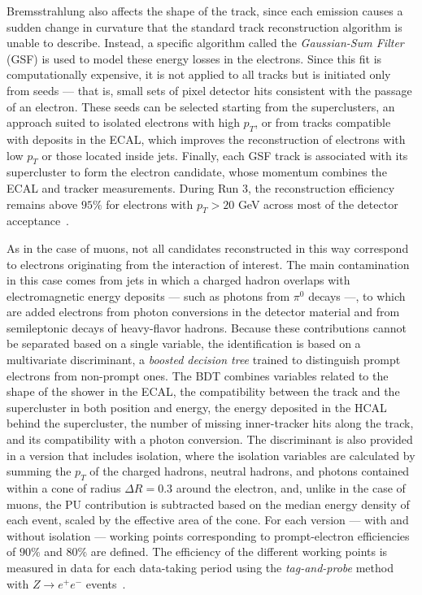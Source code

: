 Bremsstrahlung also affects the shape of the track, since each emission causes a sudden change in curvature that the standard track reconstruction algorithm is unable to describe. Instead, a specific algorithm called the \textit{Gaussian-Sum Filter} (GSF) is used to model these energy losses in the electrons. Since this fit is computationally expensive, it is not applied to all tracks but is initiated only from seeds — that is, small sets of pixel detector hits consistent with the passage of an electron. These seeds can be selected starting from the superclusters, an approach suited to isolated electrons with high $p_T$, or from tracks compatible with deposits in the ECAL, which improves the reconstruction of electrons with low $p_T$ or those located inside jets. Finally, each GSF track is associated with its supercluster to form the electron candidate, whose momentum combines the ECAL and tracker measurements. During Run 3, the reconstruction efficiency remains above $95\%$ for electrons with $p_T > 20$ GeV across most of the detector acceptance~\cite{CMS-DP-2024-052}.


As in the case of muons, not all candidates reconstructed in this way correspond to electrons originating from the interaction of interest. The main contamination in this case comes from jets in which a charged hadron overlaps with electromagnetic energy deposits — such as photons from $\pi^0$ decays —, to which are added electrons from photon conversions in the detector material and from semileptonic decays of heavy-flavor hadrons. Because these contributions cannot be separated based on a single variable, the identification is based on a multivariate discriminant, a \textit{boosted decision tree} trained to distinguish prompt electrons from non-prompt ones. The BDT combines variables related to the shape of the shower in the ECAL, the compatibility between the track and the supercluster in both position and energy, the energy deposited in the HCAL behind the supercluster, the number of missing inner-tracker hits along the track, and its compatibility with a photon conversion. The discriminant is also provided in a version that includes isolation, where the isolation variables are calculated by summing the $p_T$ of the charged hadrons, neutral hadrons, and photons contained within a cone of radius $\Delta R = 0.3$ around the electron, and, unlike in the case of muons, the PU contribution is subtracted based on the median energy density of each event, scaled by the effective area of the cone. For each version — with and without isolation — working points corresponding to prompt-electron efficiencies of $90\%$ and $80\%$ are defined. The efficiency of the different working points is measured in data for each data-taking period using the \textit{tag-and-probe} method with $Z\to e^+e^-$ events~\cite{CMS-DP-2024-052}.


